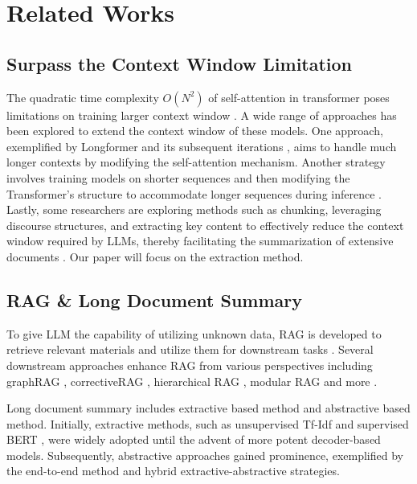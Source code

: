 \section{Related Works}
\subsection{Surpass the Context Window Limitation}
The quadratic time complexity \(O(N^{2})\) of self-attention in transformer \cite{vaswani2023attention} poses limitations on training larger context window \cite{ouyang2022training,openai2024gpt4}. A wide range of approaches has been explored to extend the context window of these models. One approach, exemplified by Longformer and its subsequent iterations \cite{beltagy2020longformer}, aims to handle much longer contexts by modifying the self-attention mechanism. Another strategy involves training models on shorter sequences and then modifying the Transformer's structure to accommodate longer sequences during inference \cite{press2022train}. Lastly, some researchers are exploring methods such as chunking, leveraging discourse structures, and extracting key content to effectively reduce the context window required by LLMs, thereby facilitating the summarization of extensive documents \cite{Koh_2022}. Our paper will focus on the extraction method.

\subsection{RAG \& Long Document Summary}
To give LLM the capability of utilizing unknown data, RAG is developed to retrieve relevant materials and utilize them for downstream tasks \cite{lewis2021retrievalaugmentedgenerationknowledgeintensivenlp}. Several downstream approaches enhance RAG from various perspectives including graphRAG \cite{edge2025localglobalgraphrag}, correctiveRAG \cite{yan2024correctiveretrievalaugmentedgeneration}, hierarchical RAG \cite{sarthi2024raptorrecursiveabstractiveprocessing}, modular RAG \cite{gao2024modularragtransformingrag} and more \cite{10.2308/ISYS-2023-047}.

Long document summary includes extractive based method and abstractive based method. Initially, extractive methods, such as unsupervised Tf-Idf \cite{liang-etal-2021-improving} and supervised BERT \cite{devlin2019bert}, were widely adopted until the advent of more potent decoder-based models. Subsequently, abstractive approaches gained prominence, exemplified by the end-to-end method \cite{lewis2019bart} and hybrid extractive-abstractive strategies\cite{zhang2020pegasus, Yuan_Wang_Cao_Li_2023, xie2022gretel, lim-song-2023-improving}.

